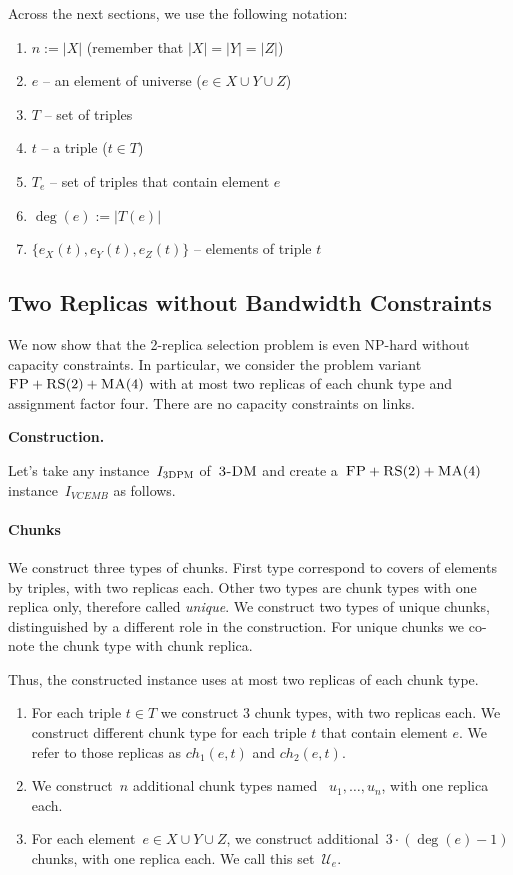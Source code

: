 \documentclass[preprint,12pt]{elsarticle}
\newcommand{\FP}{\textsc{FP}}
\newcommand{\RS}{\textsc{RS}}
\newcommand{\MA}{\textsc{MA}}
\newcommand{\TDPM}{\textsc{3DPM}}
\newcommand{\UniqueE}{{\ensuremath{\mathcal{U}_e}}}
\newcommand{\VCEMB}{VCEMB}
\newcommand{\TDM}{\textsc{3-DM}}
\begin{document}
Across the next sections, we use the following notation:

\begin{enumerate}
  \item $n := |X|$ (remember that $|X| = |Y| = |Z|$)
  \item $e$ -- an element of universe ($e \in X \cup Y \cup Z$)
  \item $T$ -- set of triples
  \item $t$ -- a triple ($t \in T$)
  \item $T_e$ -- set of triples that contain element $e$
  \item $\deg(e) := |T(e)|$
  \item $\lbrace e_X(t), e_Y(t), e_Z(t) \rbrace$ -- elements of triple $t$
\end{enumerate}

\subsection{Two Replicas without Bandwidth Constraints}

We now show that the 2-replica selection problem is even NP-hard
without capacity constraints.  In particular, we consider the problem
variant~$\FP+\RS(2)+\MA(4)$ with at most two replicas of each chunk type and assignment factor
four. There are no capacity constraints on links.

\textbf{Construction.}

Let's take any instance~$I_{\TDPM}$ of~$\TDM$ and create a~$\FP+\RS(2)+\MA(4)$
instance~$I_{\VCEMB}$ as follows.

\paragraph{Chunks}

We construct three types of chunks. First type correspond to covers of elements by triples, with two replicas each. Other two types are chunk types with one replica only, therefore called \emph{unique}. We construct two types of unique chunks, distinguished by a different role in the construction. For unique chunks we co-note the chunk type with chunk replica.

Thus, the constructed instance uses at most two replicas of each chunk type.

\begin{enumerate}
  \item For each triple $t\in T$ we construct $3$ chunk types, with two replicas each. We construct different chunk type for each triple $t$ that contain element $e$. We refer to those replicas as $ch_1(e, t)$ and $ch_2(e, t)$.
  \item We construct~$n$ additional chunk types named
  ~$u_1, \ldots, u_n$, with one replica each.
  \item For each element~$e\in X\cup Y\cup Z$,
  we construct additional~$3\cdot(\deg(e) - 1)$ chunks, with one replica each.
  We call this set~$\UniqueE$.
\end{enumerate}
\end{document}
